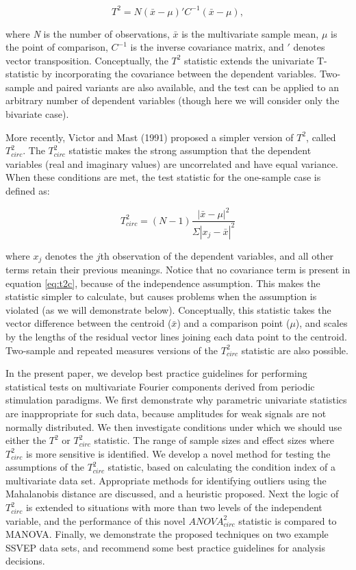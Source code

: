 \documentclass[]{article}
\begin{document}
\begin{equation}
\label{eq:t2eq}
T^2 = N(\bar{x} - \mu)' C^{-1} (\bar{x} - \mu),
\end{equation}

where \emph{N} is the number of observations, \(\bar{x}\) is the multivariate sample mean, \(\mu\) is the point of comparison, \(C^{-1}\) is the inverse covariance matrix, and \('\) denotes vector transposition. Conceptually, the \(T^2\) statistic extends the univariate T-statistic by incorporating the covariance between the dependent variables. Two-sample and paired variants are also available, and the test can be applied to an arbitrary number of dependent variables (though here we will consider only the bivariate case).

More recently, Victor and Mast (1991) proposed a simpler version of \(T^2\), called \(T^2_{circ}\). The \(T^2_{circ}\) statistic makes the strong assumption that the dependent variables (real and imaginary values) are uncorrelated and have equal variance. When these conditions are met, the test statistic for the one-sample case is defined as:

\begin{equation}
\label{eq:t2c}
T^2_{circ} = (N-1)\frac{|\bar{x}-\mu|^2}{\Sigma|x_j - \bar{x}|^2}
\end{equation}

where \(x_j\) denotes the \(j\)th observation of the dependent variables, and all other terms retain their previous meanings. Notice that no covariance term is present in equation \eqref{eq:t2c}, because of the independence assumption. This makes the statistic simpler to calculate, but causes problems when the assumption is violated (as we will demonstrate below). Conceptually, this statistic takes the vector difference between the centroid (\(\bar{x}\)) and a comparison point (\(\mu\)), and scales by the lengths of the residual vector lines joining each data point to the centroid. Two-sample and repeated measures versions of the \(T^2_{circ}\) statistic are also possible.

In the present paper, we develop best practice guidelines for performing statistical tests on multivariate Fourier components derived from periodic stimulation paradigms. We first demonstrate why parametric univariate statistics are inappropriate for such data, because amplitudes for weak signals are not normally distributed. We then investigate conditions under which we should use either the \(T^2\) or \(T^2_{circ}\) statistic. The range of sample sizes and effect sizes where \(T^2_{circ}\) is more sensitive is identified. We develop a novel method for testing the assumptions of the \(T^2_{circ}\) statistic, based on calculating the condition index of a multivariate data set. Appropriate methods for identifying outliers using the Mahalanobis distance are discussed, and a heuristic proposed. Next the logic of \(T^2_{circ}\) is extended to situations with more than two levels of the independent variable, and the performance of this novel \(ANOVA^2_{circ}\) statistic is compared to MANOVA. Finally, we demonstrate the proposed techniques on two example SSVEP data sets, and recommend some best practice guidelines for analysis decisions.
\end{document}
